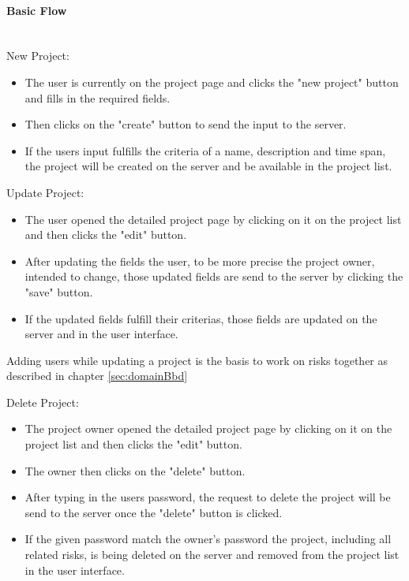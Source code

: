\newpage
\paragraph*{Basic Flow} \mbox{}\\
\noindent
New Project:
\begin{itemize}
	\vspace{-3mm}
	\setlength\itemsep{-1.5em}
	\item The user is currently on the project page and clicks the "new project" button and fills in the required fields.
	\item Then clicks on the "create" button to send the input to the server.
	\item If the users input fulfills the criteria of a name, description and time span, the project will be created on the server and be available in the project list.
\end{itemize}


\noindent
Update Project: 
\begin{itemize}
	\vspace{-3mm}
	\setlength\itemsep{-1em}
	\item The user opened the detailed project page by clicking on it on the project list and then clicks the "edit" button.
	\item After updating the fields the user, to be more precise the project owner, intended to change, those updated fields are send to the server by clicking the "save" button.
	\item If the updated fields fulfill their criterias, those fields are updated on the server and in the user interface.
\end{itemize} 
Adding users while updating a project is the basis to work on risks together as described in chapter \ref{sec:domainBbd}

\noindent
Delete Project:
\begin{itemize}
	\vspace{-3mm}
	\setlength\itemsep{-1em}
	\item The project owner opened the detailed project page by clicking on it on the project list and then clicks the "edit" button.
	\item The owner then clicks on the "delete" button. 
	\item After typing in the users password, the request to delete the project will be send to the server once the "delete" button is clicked.
	\item If the given password match the owner's password the project, including all related risks, is being deleted on the server and removed from the project list in the user interface.
\end{itemize}

